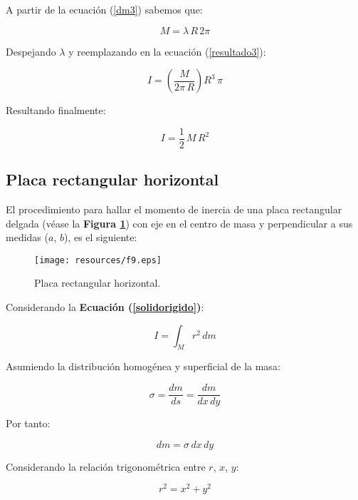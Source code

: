 \documentclass[letter,oneside,11pt]{article}
\begin{document}
A partir de la ecuación (\ref{dm3}) sabemos que:

\begin{equation*}
    M = \lambda\, R\, 2\pi
\end{equation*}

Despejando $\lambda$ y reemplazando en la ecuación (\ref{resultado3}):

\begin{equation*}
    I = \left( \frac{M}{2\pi\, R} \right) R^3\, \pi
\end{equation*}

Resultando finalmente:

\begin{equation}
    I = \frac{1}{2}\, M\, R^2
\end{equation}

\subsection{Placa rectangular horizontal}
El procedimiento para hallar el momento de inercia de una placa rectangular
delgada (véase la \textbf{Figura \ref{figura9}}) con eje en el centro de masa y
perpendicular a sus medidas ($a$, $b$), es el siguiente:

\begin{figure}
\centering
\texttt{[image: resources/f9.eps]}
\caption{Placa rectangular horizontal.}
\label{figura9}
\end{figure}

Considerando la \textbf{Ecuación (\ref{solidorigido})}:

\begin{equation*}
    I = \int_{M} r^2\, dm
\tag{4}
\end{equation*}

Asumiendo la distribución homogénea y superficial de la masa:

\begin{equation*}
    \sigma = \frac{dm}{ds} = \frac{dm}{dx\, dy}
\end{equation*}

Por tanto:

\begin{equation}
    dm = \sigma\, dx\, dy
\label{dm4}
\end{equation}

Considerando la relación trigonométrica entre $r$, $x$, $y$:

\begin{equation}
    r^2 = x^2 + y^2
\label{r4}
\end{equation}
\end{document}
